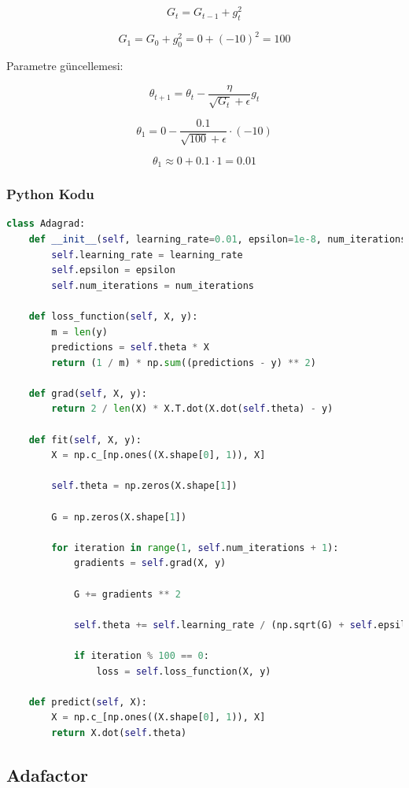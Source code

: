 \[ G_t = G_{t-1} + g_{t}^2 \]

\[ G_1 = G_0 + g_{0}^2 = 0 + (-10)^2 = 100 \]

Parametre güncellemesi:

\[ \theta_{t+1} = \theta_t - \frac{\eta}{\sqrt{G_t} + \epsilon} g_t \]

\[ \theta_1 = 0 - \frac{0.1}{\sqrt{100} + \epsilon} \cdot (-10)\]

\[ \theta_1 \approx 0 + 0.1 \cdot 1 = 0.01 \]

\subsubsection{Python Kodu}

\begin{lstlisting}[language=Python]
class Adagrad:
    def __init__(self, learning_rate=0.01, epsilon=1e-8, num_iterations=1000):
        self.learning_rate = learning_rate
        self.epsilon = epsilon
        self.num_iterations = num_iterations

    def loss_function(self, X, y):
        m = len(y)
        predictions = self.theta * X
        return (1 / m) * np.sum((predictions - y) ** 2)

    def grad(self, X, y):
        return 2 / len(X) * X.T.dot(X.dot(self.theta) - y)    

    def fit(self, X, y):
        X = np.c_[np.ones((X.shape[0], 1)), X]

        self.theta = np.zeros(X.shape[1])

        G = np.zeros(X.shape[1])
        
        for iteration in range(1, self.num_iterations + 1):
            gradients = self.grad(X, y)

            G += gradients ** 2

            self.theta += self.learning_rate / (np.sqrt(G) + self.epsilon) * gradients

            if iteration % 100 == 0:
                loss = self.loss_function(X, y)

    def predict(self, X):
        X = np.c_[np.ones((X.shape[0], 1)), X]
        return X.dot(self.theta)
\end{lstlisting}

\newpage

\subsection{Adafactor}

